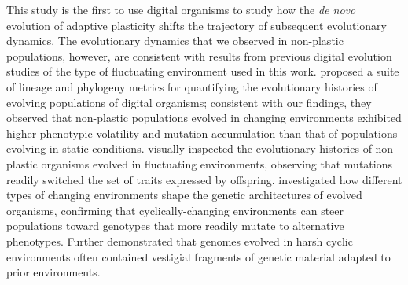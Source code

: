 This study is the first to use digital organisms to study how the \textit{de novo} evolution of adaptive plasticity shifts the trajectory of subsequent evolutionary dynamics.
The evolutionary dynamics that we observed in non-plastic populations, however, are consistent with results from previous digital evolution studies of the type of fluctuating environment used in this work.
\cite{dolson_interpreting_2020} proposed a suite of lineage and phylogeny metrics for quantifying the evolutionary histories of evolving populations of digital organisms; consistent with our findings, they observed that non-plastic populations evolved in changing environments exhibited higher phenotypic volatility and mutation accumulation than that of populations evolving in static conditions.
\cite{lalejini_evolutionary_2016} visually inspected the evolutionary histories of non-plastic organisms evolved in fluctuating environments, observing that mutations readily switched the set of traits expressed by offspring.
\cite{canino-koning_evolution_2016} investigated how different types of changing environments shape the genetic architectures of evolved organisms, confirming that cyclically-changing environments can steer populations toward genotypes that more readily mutate to alternative phenotypes.
Further \cite{canino-koning_evolution_2016} demonstrated that genomes evolved in harsh cyclic environments often contained vestigial fragments of genetic material adapted to prior environments.





